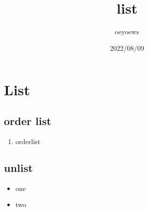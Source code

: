 \documentclass{article}
\title{list}
\author{oeyoews}
\date{2022/08/09}
\begin{document}
\maketitle

\section{List}%
\label{List}

\subsection{order list}%
\label{sub:order list}

\begin{enumerate}
  \item orderlist
\end{enumerate}

\subsection{unlist}%
\label{sub:unlist}

\begin{itemize}
  \item one
  \item two
\end{itemize}
\end{document}

